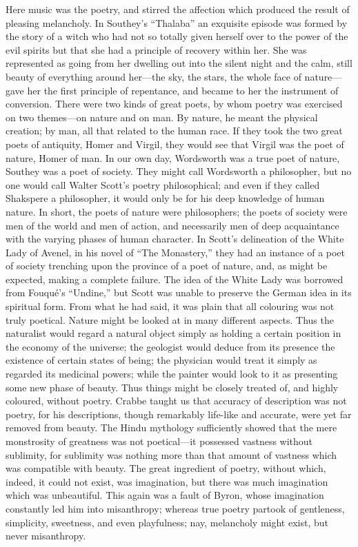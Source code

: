 Here music was the poetry, and stirred the
affection which produced the result of pleasing melancholy. In Southey's
``Thalaba'' an exquisite episode was formed by the story of a witch who
had not so totally given herself over to the power of the evil
spirits but that she had a principle of recovery within her. She was
represented as going from her dwelling out into the silent night and
the calm, still beauty of everything around her—the sky, the stars,
the whole face of nature—gave her the first principle of repentance,
and became to her the instrument of conversion. There were two kinds
of great poets, by whom poetry was exercised on two themes—on nature
and on man. By nature, he meant the physical creation; by man, all
that related to the human race. If they took the two great poets of
antiquity, Homer and Virgil, they would see that Virgil was the poet
of nature, Homer of man. In our own day, Wordsworth was a true poet of
nature, Southey was a poet of society. They might call Wordsworth a
philosopher, but no one would call Walter Scott's poetry
philosophical; and even if they called Shakspere a philosopher, it
would only be for his deep knowledge of human nature. In short, the
poets of nature were philosophers; the poets of society were men of
the world and men of action, and necessarily men of deep acquaintance
with the varying phases of human character. In Scott's delineation of
the White Lady of Avenel, in his novel of ``The Monastery,'' they had an
instance of a poet of society trenching upon the province of a poet of
nature, and, as might be expected, making a complete failure. The idea
of the White Lady was borrowed from Fouqué's ``Undine,'' but Scott was
unable to preserve the German idea in its spiritual form. From what he
had said, it was plain that all colouring was not truly poetical.
Nature might be looked at in many different aspects. Thus the
naturalist would regard a natural object simply as holding a certain
position in the economy of the universe; the geologist would deduce
from its presence the existence of certain states of being; the
physician would treat it simply as regarded its medicinal powers;
while the painter would look to it as presenting some new phase of
beauty. Thus things might be closely treated of, and highly coloured,
without poetry. Crabbe taught us that accuracy of description was not
poetry, for his descriptions, though remarkably life-like and
accurate, were yet far removed from beauty. The Hindu mythology
sufficiently showed that the mere monstrosity of greatness was not
poetical—it possessed vastness without sublimity, for sublimity was
nothing more than that amount of vastness which was compatible with
beauty. The great ingredient of poetry, without which, indeed, it
could not exist, was imagination, but there was much imagination
which was unbeautiful. This again was a fault of Byron, whose
imagination constantly led him into misanthropy; whereas true poetry
partook of gentleness, simplicity, sweetness, and even playfulness;
nay, melancholy might exist, but never misanthropy.

